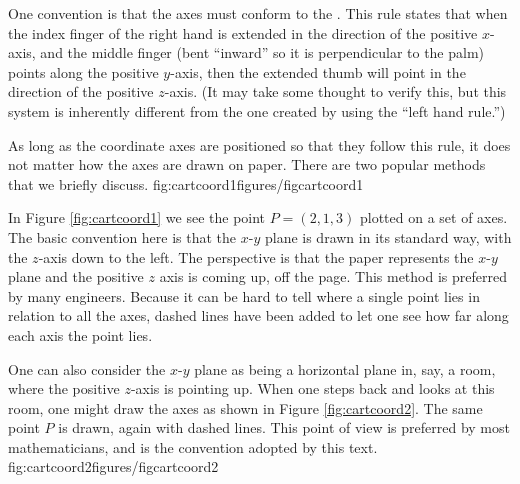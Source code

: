 One convention is that the axes must conform to the . This rule states that when the index finger of the right hand is extended in the direction of the positive $x$-axis, and the middle finger (bent ``inward'' so it is perpendicular to the palm) points along the positive $y$-axis, then the extended thumb will point in the direction of the positive $z$-axis. (It may take some thought to verify this, but this system is inherently different from the one created by using the ``left hand rule.'')

As long as the coordinate axes are positioned so that they follow this rule, it does not matter how the axes are drawn on paper. There are two popular methods that we briefly discuss.
%
{fig:cartcoord1}{figures/figcartcoord1}%


In Figure \ref{fig:cartcoord1} we see the point $P=(2,1,3)$ plotted on a set of axes. The basic convention here is that the $x$-$y$ plane is drawn in its standard way, with the $z$-axis down to the left. The perspective  is that the paper represents the $x$-$y$ plane and the positive $z$ axis is coming up, off the page. This method is preferred by many engineers. Because it can be hard to tell where a single point lies in relation to all the axes, dashed lines have been added to let one see how far along each axis the point lies.

One can also consider the $x$-$y$ plane as being a horizontal plane in, say, a room, where the positive $z$-axis is pointing up. When one steps back and looks at this room, one might draw the axes as shown in Figure \ref{fig:cartcoord2}. The same point $P$ is drawn, again with dashed lines. This point of view is preferred by most mathematicians, and is the convention adopted by this text.
%
{fig:cartcoord2}{figures/figcartcoord2}%
\\

